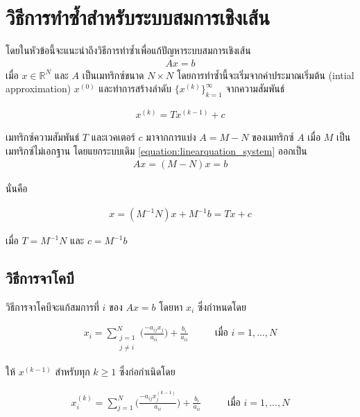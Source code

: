 \section{วิธีการทำซ้ำสำหรับระบบสมการเชิงเส้น}

\hspace{1cm} โดยในหัวข้อนี้จะแนะนำถึงวิธีการทำซ้ำเพื่อแก้ปัญหาระบบสมการเชิงเส้น
\begin{align}
    Ax = b
    \label{equation:linearquation_system}
\end{align}
เมื่อ $x \in \mathbb{R}^{N}$ และ $A$ เป็นเมทริกซ์ขนาด $N \times N$ โดยการทำซ้ำนี้จะเริ่มจากค่าประมาณเริ่มต้น (intial approximation) $x^{(0)}$ และทำการสร้างลำดับ $\{ x^{(k)} \}_{k=1}^\infty$ จากความสัมพันธ์


\begin{align}
    x^{(k)} = Tx^{(k-1)} + c
\end{align}

เมทริกซ์ความสัมพันธ์ $T$ และเวคเตอร์ $c$ มาจากการแบ่ง $A = M-N$ ของเมทริกซ์ $A$ เมื่อ $M$ เป็นเมทริกซ์ไม่เอกฐาน โดยแยกระบบเดิม \ref{equation:linearquation_system} ออกเป็น
\begin{align}
    Ax = (M - N)x = b
\end{align}

นั่นคือ

\begin{align}
    x = (M^{-1} N)x + M^{-1}b = Tx + c
\end{align}


เมื่อ $T = M^{-1}N$ และ $c = M^{-1}b$

\subsection{วิธีการจาโคบี}

วิธีการจาโคบีจะแก้สมการที่ $i$ ของ $Ax = b$ โดยหา $x_i$ ซึ่งกำหนดโดย

\begin{align}
    x_i = \sum_{\substack{j=1 \\ j\neq i}}^{N} \Big( \frac{- a_{ij}x_j}{a_{ii}} \Big) + \frac{b_i}{a_{ii}} \hspace{1cm}\text{ เมื่อ } i=1,...,N
\end{align}

ให้ $x^{(k-1)}$ สำหรับทุก $k \geq 1$ ซึ่งก่อกำเนิดโดย

\begin{align}
    x_i^{(k)} = \sum_{j=1}^{N}  \Big( \frac{- a_{ij}x_j^{(k-1)}}{a_{ii}} \Big) + \frac{b_i}{a_{ii}} \hspace{1cm}\text{ เมื่อ } i=1,...,N
\end{align}

